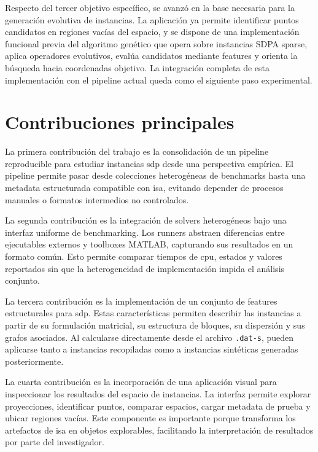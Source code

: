 Respecto del tercer objetivo específico, se avanzó en la base necesaria para la
generación evolutiva de instancias.
La aplicación ya permite identificar puntos candidatos en regiones vacías del espacio,
y se dispone de una implementación funcional previa del algoritmo genético que opera
sobre instancias SDPA sparse, aplica operadores evolutivos, evalúa candidatos mediante
features y orienta la búsqueda hacia coordenadas objetivo.
La integración completa de esta implementación con el pipeline actual queda como el
siguiente paso experimental.

\section{Contribuciones principales}
\label{sec:conclusiones_contribuciones}

La primera contribución del trabajo es la consolidación de un pipeline reproducible
para estudiar instancias \acrshort{sdp} desde una perspectiva empírica.
El pipeline permite pasar desde colecciones heterogéneas de benchmarks hasta una
metadata estructurada compatible con \acrshort{isa}, evitando depender de procesos
manuales o formatos intermedios no controlados.

La segunda contribución es la integración de solvers heterogéneos bajo una interfaz
uniforme de benchmarking.
Los runners abstraen diferencias entre ejecutables externos y toolboxes MATLAB,
capturando sus resultados en un formato común.
Esto permite comparar tiempos de \acrshort{cpu}, estados y valores reportados sin que
la heterogeneidad de implementación impida el análisis conjunto.

La tercera contribución es la implementación de un conjunto de features estructurales
para \acrshort{sdp}.
Estas características permiten describir las instancias a partir de su formulación
matricial, su estructura de bloques, su dispersión y sus grafos asociados.
Al calcularse directamente desde el archivo \texttt{.dat-s}, pueden aplicarse tanto a
instancias recopiladas como a instancias sintéticas generadas posteriormente.

La cuarta contribución es la incorporación de una aplicación visual para inspeccionar
los resultados del espacio de instancias.
La interfaz permite explorar proyecciones, identificar puntos, comparar espacios,
cargar metadata de prueba y ubicar regiones vacías.
Este componente es importante porque transforma los artefactos de \acrshort{isa} en
objetos explorables, facilitando la interpretación de resultados por parte del
investigador.

